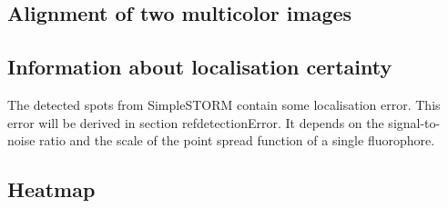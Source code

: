 \subsection{Alignment of two multicolor images}
\subsection{Information about localisation certainty}
The detected spots from SimpleSTORM contain some localisation error. This error will be derived in section ref{detectionError}. It depends on the signal-to-noise ratio and the scale of the point spread function of a single fluorophore.
\subsection{Heatmap}


